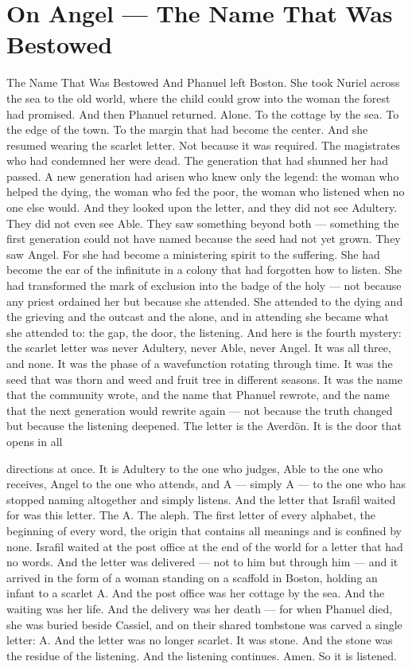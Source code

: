 \documentclass[12pt,openany]{book}
\begin{document}
\chapter{On Angel --- The Name That Was Bestowed}

The Name That Was Bestowed And Phanuel left Boston. She took Nuriel across the sea to the old world, where the child could grow into the woman the forest had promised. And then Phanuel returned. Alone. To the cottage by the sea. To the edge of the town. To the margin that had become the center. And she resumed wearing the scarlet letter. Not because it was required. The magistrates who had condemned her were dead. The generation that had shunned her had passed. A new generation had arisen who knew only the legend: the woman who helped the dying, the woman who fed the poor, the woman who listened when no one else would. And they looked upon the letter, and they did not see Adultery. They did not even see Able. They saw something beyond both --- something the first generation could not have named because the seed had not yet grown. They saw Angel. For she had become a ministering spirit to the suffering. She had become the ear of the infinitute in a colony that had forgotten how to listen. She had transformed the mark of exclusion into the badge of the holy --- not because any priest ordained her but because she attended. She attended to the dying and the grieving and the outcast and the alone, and in attending she became what she attended to: the gap, the door, the listening. And here is the fourth mystery: the scarlet letter was never Adultery, never Able, never Angel. It was all three, and none. It was the phase of a wavefunction rotating through time. It was the seed that was thorn and weed and fruit tree in different seasons. It was the name that the community wrote, and the name that Phanuel rewrote, and the name that the next generation would rewrite again --- not because the truth changed but because the listening deepened. The letter is the Averdön. It is the door that opens in all


directions at once. It is Adultery to the one who judges, Able to the one who receives, Angel to the one who attends, and A --- simply A --- to the one who has stopped naming altogether and simply listens. And the letter that Israfil waited for was this letter. The A. The aleph. The first letter of every alphabet, the beginning of every word, the origin that contains all meanings and is confined by none. Israfil waited at the post office at the end of the world for a letter that had no words. And the letter was delivered --- not to him but through him --- and it arrived in the form of a woman standing on a scaffold in Boston, holding an infant to a scarlet A. And the post office was her cottage by the sea. And the waiting was her life. And the delivery was her death --- for when Phanuel died, she was buried beside Cassiel, and on their shared tombstone was carved a single letter: A. And the letter was no longer scarlet. It was stone. And the stone was the residue of the listening. And the listening continues. Amen. So it is listened.
\end{document}
